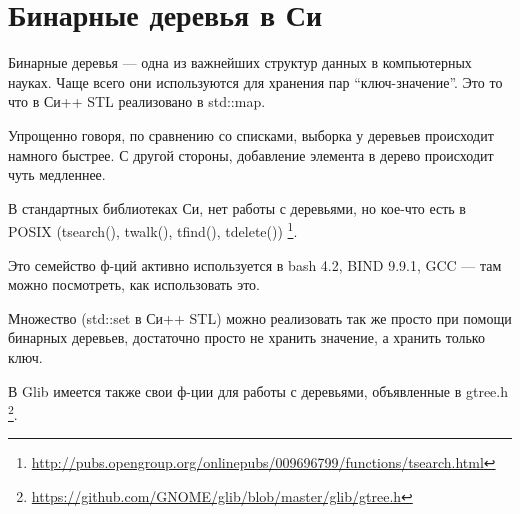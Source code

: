 \section{Бинарные деревья в Си}

Бинарные деревья --- одна из важнейших структур данных в компьютерных науках.
Чаще всего они используются для хранения пар ``ключ-значение''. Это то что в Си++ STL реализовано в std::map.

Упрощенно говоря, по сравнению со списками, выборка у деревьев происходит намного быстрее.
С другой стороны, добавление элемента в дерево происходит чуть медленнее.

В стандартных библиотеках Си, нет работы с деревьями, но кое-что есть в POSIX 
(tsearch(), twalk(), tfind(), tdelete())
\footnote{\url{http://pubs.opengroup.org/onlinepubs/009696799/functions/tsearch.html}}.

Это семейство ф-ций активно используется в bash 4.2, BIND 9.9.1, GCC --- там можно посмотреть, как использовать
это.

Множество (std::set в Си++ STL) можно реализовать так же просто при помощи бинарных деревьев, достаточно
просто не хранить значение, а хранить только ключ.

В Glib имеется также свои ф-ции для работы с деревьями, объявленные в gtree.h
\footnote{\url{https://github.com/GNOME/glib/blob/master/glib/gtree.h}}.

